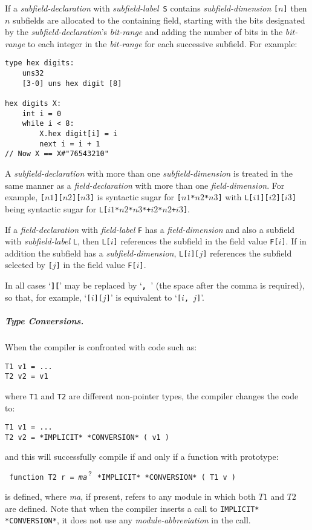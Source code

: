 \documentclass[12pt]{article}
\newcommand{\subsubsubsubsection}[1]{\subparagraph[#1]{#1.}}
\newcommand{\TT}[1]{{\tt \bfseries #1}}
\newcommand{\QMARK}{{$^{\,\mbox{\footnotesize ?}}$}}
\newcommand{\EOL}{\penalty \exhyphenpenalty}
\newenvironment{indpar}[1][0.3in]%
	{\begin{list}{}%
		     {\setlength{\itemsep}{0in}%
		      \setlength{\topsep}{0in}%
		      \setlength{\parsep}{1ex}%
		      \setlength{\labelwidth}{#1}%
		      \setlength{\leftmargin}{#1}%
		      \addtolength{\leftmargin}{\labelsep}}%
	 \item}%
	{\end{list}}
\begin{document}
If a {\em subfield-declaration} with {\em subfield-label}\, {\tt S} contains 
{\em subfield-dimension} {\tt [$n$]} then $n$ subfields are
allocated to the containing field, starting with the bits
designated by the {\em subfield-declaration}'s {\em bit-range}
and adding the number of bits in the {\em bit-range} to each integer
in the {\em bit-range} for each successive subfield.
For example:

\begin{indpar}\begin{verbatim}
type hex digits:
    uns32
    [3-0] uns hex digit [8]

hex digits X:
    int i = 0
    while i < 8:
        X.hex digit[i] = i
        next i = i + 1
// Now X == X#"76543210"
\end{verbatim}\end{indpar}

A {\em subfield-declaration} with more than one {\em subfield-dimension} is
treated in the same manner as a {\em field-declaration} with
more than one {\em field-dimension}.  For example,
{\tt [$n1$][$n2$][$n3$]} is
syntactic sugar for {\tt [$n1$*$n2$*$n3$]} with
{\tt L[$i1$][$i2$][$i3$]} being syntactic sugar for
{\tt L[$i1$*$n2$*$n3$*+\EOL $i2$*$n2$+\EOL $i3$]}.

If a {\em field-declaration} with {\em field-label} {\tt F}
has a {\em field-dimension}
and also a subfield with {\em subfield-label} {\tt L}, then
{\tt L[$i$]} references the subfield in the field value {\tt F[$i$]}.
If in addition the subfield has a {\em subfield-dimension},
{\tt L[$i$][$j$]} references the subfield selected by {\tt [$j$]}
in the field value {\tt F[$i$]}.

In all cases `\TT{][}' may be replaced by `\TT{,~}' (the space
after the comma is required), so that,
for example, `{\tt [$i$][$j$]}' is equivalent to `{\tt [$i$, $j$]}'.

\subsubsubsubsection{Type Conversions}
\label{TYPE-CONVERSIONS}

When the compiler is confronted with code such as:
\begin{indpar}\begin{verbatim}
T1 v1 = ...
T2 v2 = v1
\end{verbatim}\end{indpar}
where {\tt T1} and {\tt T2} are different non-pointer types,
the compiler changes the code to:
\begin{indpar}\begin{verbatim}
T1 v1 = ...
T2 v2 = *IMPLICIT* *CONVERSION* ( v1 )
\end{verbatim}\end{indpar}
and this will successfully compile if and only if a function
with prototype:
\begin{indpar} \tt
function T2 r = {\em ma}\QMARK{} *IMPLICIT* *CONVERSION* ( T1 v )
\end{indpar}
is defined, where {\em ma}, if present, refers to any module
in which both $T1$ and $T2$ are defined.
Note that when the compiler inserts a call to {\tt *IMPLICIT* *CONVERSION*},
it does not use any {\em module-abbreviation} in the call.
\end{document}
